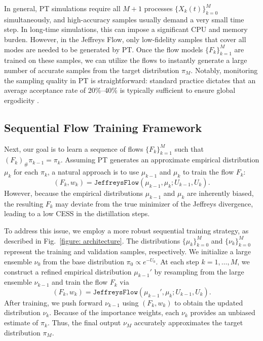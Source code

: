 \documentclass[%
 reprint,
 amsmath,amssymb,
 aps,
 pre,
]{revtex4-2}
\begin{document}
In general, PT simulations require all $M+1$ processes $\{X_k(t)\}_{k=0}^M$ simultaneously, and high-accuracy samples usually demand a very small time step. In long-time simulations, this can impose a significant CPU and memory burden. However, in the Jeffreys Flow, only low-fidelity samples that cover all modes are needed to be generated by PT. Once the flow models $\{F_k\}_{k=1}^M$ are trained on these samples, we can utilize the flows to instantly generate a large number of accurate samples from the target distribution $\pi_M$. Notably, monitoring the sampling quality in PT is straightforward: standard practice dictates that an average acceptance rate of 20\%--40\% is typically sufficient to ensure global ergodicity \cite{syed2022non}.

\subsection{Sequential Flow Training Framework}

Next, our goal is to learn a sequence of flows $\{F_k\}_{k=1}^M$ such that $(F_k)_\# \pi_{k-1} = \pi_k$. Assuming PT generates an approximate empirical distribution $\mu_k$ for each $\pi_k$, a natural approach is to use $\mu_{k-1}$ and $\mu_k$ to train the flow $F_k$:
\begin{equation*}
	(F_k, w_k) = \mathtt{JeffreysFlow}(\mu_{k-1} , \mu_k ; U_{k-1} , U_k ).
\end{equation*}
However, because the empirical distributions $\mu_{k-1}$ and $\mu_k$ are inherently biased, the resulting $F_k$ may deviate from the true minimizer of the Jeffreys divergence, leading to a low CESS in the distillation steps.

To address this issue, we employ a more robust sequential training strategy, as described in Fig.~\ref{figure: architecture}. The distributions $\{\mu_k\}_{k=0}^M$ and $\{\nu_k\}_{k=0}^M$ represent the training and validation samples, respectively. We initialize a large ensemble $\nu_0$
from the base distribution $\pi_0\propto e^{-U_0}$. At each step $k=1,\dots,M$, we construct a refined empirical distribution $\mu_{k-1}'$ by resampling from the large ensemble $\nu_{k-1}$ and train the flow $F_k$ via
\begin{equation*}
	(F_k, w_k) = \mathtt{JeffreysFlow}(\mu_{k-1}' , \mu_k ; U_{k-1} , U_k ).
\end{equation*}
After training, we push forward $\nu_{k-1}$ using $(F_k, w_k)$ to obtain the updated distribution $\nu_k$. Because of the importance weights, each $\nu_k$ provides an unbiased estimate of $\pi_k$. Thus, the final output $\nu_M$ accurately approximates the target distribution $\pi_M$.
\end{document}
